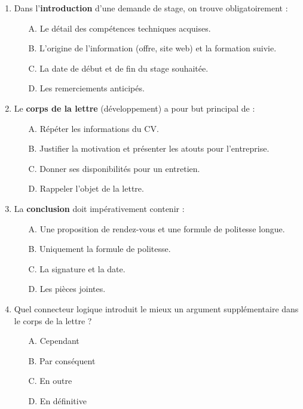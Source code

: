 \documentclass[11pt]{article}
\begin{document}
\begin{exercice}
\begin{enumerate}
    \item Dans l'\textbf{introduction} d'une demande de stage, on trouve obligatoirement :
    \begin{itemize}
        \item[A.] Le détail des compétences techniques acquises.
        \item[B.] L'origine de l'information (offre, site web) et la formation suivie.
        \item[C.] La date de début et de fin du stage souhaitée.
        \item[D.] Les remerciements anticipés.
    \end{itemize}
    \item Le \textbf{corps de la lettre} (développement) a pour but principal de :
    \begin{itemize}
        \item[A.] Répéter les informations du CV.
        \item[B.] Justifier la motivation et présenter les atouts pour l'entreprise.
        \item[C.] Donner ses disponibilités pour un entretien.
        \item[D.] Rappeler l'objet de la lettre.
    \end{itemize}
    \item La \textbf{conclusion} doit impérativement contenir :
    \begin{itemize}
        \item[A.] Une proposition de rendez-vous et une formule de politesse longue.
        \item[B.] Uniquement la formule de politesse.
        \item[C.] La signature et la date.
        \item[D.] Les pièces jointes.
    \end{itemize}
    \item Quel connecteur logique introduit le mieux un argument supplémentaire dans le corps de la lettre ?
    \begin{itemize}
        \item[A.] Cependant
        \item[B.] Par conséquent
        \item[C.] En outre
        \item[D.] En définitive
    \end{itemize}
\end{enumerate}
\end{exercice}
\end{document}

